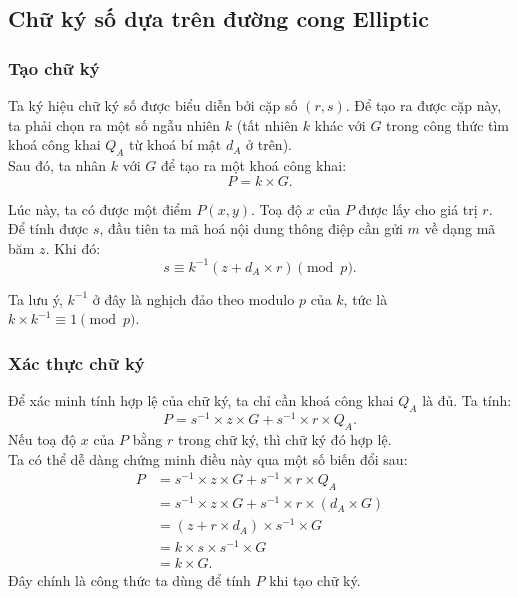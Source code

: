 \subsection*{Chữ ký số dựa trên đường cong Elliptic}

\subsubsection*{Tạo chữ ký}

Ta ký hiệu chữ ký số được biểu diễn bởi cặp số $(r,s)$. Để tạo ra được cặp này, ta phải chọn ra một số ngẫu nhiên $k$ (tất nhiên $k$ khác với $G$ trong công thức tìm khoá công khai $Q_A$ từ khoá bí mật $d_A$ ở trên).\\

Sau đó, ta nhân $k$ với $G$ để tạo ra một khoá công khai:
$$
P=k\times G.
$$

Lúc này, ta có được một điểm $P(x,y)$. Toạ độ $x$ của $P$ được lấy cho giá trị $r$.\\

Để tính được $s$, đầu tiên ta mã hoá nội dung thông điệp cần gửi $m$ về dạng mã băm $z$. Khi đó:
$$
s\equiv k^{-1}(z+d_A\times r)\pmod{p}.
$$

Ta lưu ý, $k^{-1}$ ở đây là nghịch đảo theo modulo $p$ của $k$, tức là $k\times k^{-1}\equiv1\pmod{p}$.

\subsubsection*{Xác thực chữ ký}

Để xác minh tính hợp lệ của chữ ký, ta chỉ cần khoá công khai $Q_A$ là đủ. Ta tính:
$$
P=s^{-1}\times z\times G+s^{-1}\times r\times Q_A.
$$
Nếu toạ độ $x$ của $P$ bằng $r$ trong chữ ký, thì chữ ký đó hợp lệ.\\

Ta có thể dễ dàng chứng minh điều này qua một số biến đổi sau:
\begin{align*}
    P&=s^{-1}\times z\times G+s^{-1}\times r\times Q_A\\
    &=s^{-1}\times z\times G+s^{-1}\times r\times(d_A\times G)\\
    &=(z+r\times d_A)\times s^{-1}\times G\\
    &=k\times s\times s^{-1}\times G\\
    &=k\times G.
\end{align*}
Đây chính là công thức ta dùng để tính $P$ khi tạo chữ ký.